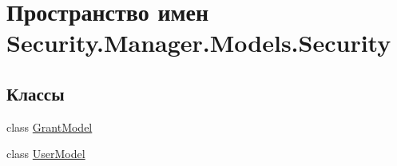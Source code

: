 \hypertarget{namespace_security_1_1_manager_1_1_models_1_1_security}{}\section{Пространство имен Security.\+Manager.\+Models.\+Security}
\label{namespace_security_1_1_manager_1_1_models_1_1_security}
\subsection*{Классы}
\begin{DoxyCompactItemize}
\item 
class \hyperlink{class_security_1_1_manager_1_1_models_1_1_security_1_1_grant_model}{Grant\+Model}
\item 
class \hyperlink{class_security_1_1_manager_1_1_models_1_1_security_1_1_user_model}{User\+Model}
\end{DoxyCompactItemize}
